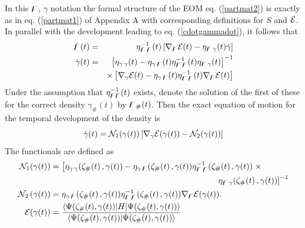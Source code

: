 In this ${\bf {\digamma }}$, $\gamma $ notation the formal structure of the
EOM eq. (\ref{partmat2}) is exactly as in eq. (\ref{partmat1}) of Appendix A
with corresponding definitions for $S$ and ${\cal E}$. In parallel with the
development leading to eq. (\ref{cdotgammadot}), it follows that 
\begin{eqnarray}
\dot{{\bf \digamma }}(t) &=&\eta _{{\bf \digamma \,\digamma }}^{-1}(t)\left[
\nabla _{{\bf \digamma }}{\cal E}(t)-\eta _{{\bf \digamma }\,\gamma }(t)\dot{%
\gamma}\right]  \nonumber \\
\dot{\gamma}(t) &=&\left[ \eta _{\gamma \,\gamma }(t)-\eta _{\gamma \,{\bf %
\digamma }}(t)\eta _{{\bf \digamma }\,{\bf \digamma }}^{-1}(t)\eta _{{\bf %
\digamma }\,\gamma }(t)\right] ^{-1}  \nonumber \\
&&\times \left[ \nabla _{\gamma }{\cal E}(t)-\eta _{\gamma \,{\bf \digamma }%
}(t)\eta _{{\bf \digamma }\,{\bf \digamma }}^{-1}(t)\nabla _{{\bf \digamma }}%
{\cal E}(t)\right]
\end{eqnarray}%
Under the assumption that $\eta _{{\bf \digamma \digamma }}^{-1}(t)$ exists,
denote the solution of the first of these for the correct density $\gamma
_{\#}(t)$ by ${\bf \digamma }_{\#}(t)$. Then the exact equation of motion
for the temporal development of the density is 
\begin{equation}
\dot{\gamma}(t)={\cal N}_{1}(\gamma (t))\left[ \nabla _{\gamma }{\cal E}%
(\gamma (t))-{\cal N}_{2}(\gamma (t))\right]
\end{equation}%
The functionals are defined as 
\begin{align}
{\cal N}_{1}(\gamma (t))& =\left[ \eta _{\gamma \,\gamma }({\bf \zeta }%
_{\#}(t)\,,\gamma (t))-\eta _{\gamma \,{\bf \digamma }}({\bf \zeta }%
_{\#}(t)\,,\gamma (t))\eta _{{\bf \digamma }\,{\bf \digamma }}^{-1}({\bf %
\zeta }_{\#}(t)\,,\gamma (t))\right. \times  \nonumber \\
& \qquad \qquad \qquad \qquad \qquad \qquad \qquad \qquad \qquad \qquad
\left. \eta _{{\bf \digamma }\,\gamma }({\bf \zeta }_{\#}(t)\,,\gamma (t))%
\right] ^{-1} \\
{\cal N}_{2}\left( \gamma (t)\right) & =\eta _{\gamma \,{\bf \digamma }}(%
{\bf \zeta }_{\#}(t)\,,\gamma (t))\eta _{{\bf \digamma }\,{\bf \digamma }%
}^{-1}({\bf \zeta }_{\#}(t)\,,\gamma (t))\nabla _{{\bf \digamma }}{\cal E}%
(\gamma (t)).\quad \\
{\cal E}(\gamma (t))& =\frac{\left\langle \Psi ({\bf \zeta }_{\#}(t),\gamma
(t))|H|\Psi ({\bf \zeta }_{\#}(t),\gamma (t))\right\rangle }{\left\langle
\Psi ({\bf \zeta }_{\#}(t),\gamma (t))|\Psi ({\bf \zeta }_{\#}(t),\gamma
(t))\right\rangle }
\end{align}

